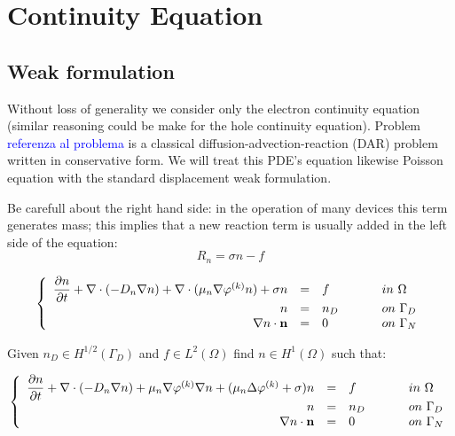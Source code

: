 \section{Continuity Equation}


\subsection{Weak formulation}
Without loss of generality we consider only the electron continuity equation (similar reasoning could be make for the hole continuity equation). Problem \textcolor{blue}{referenza al problema} is a classical diffusion-advection-reaction (DAR) problem written in conservative form. We will treat this PDE's equation likewise Poisson equation with the standard displacement weak formulation.

Be carefull about the right hand side: in the operation of many devices this term generates mass; this implies that a new reaction term is usually added in the left side of the equation:
\begin{equation}
R_n = \sigma n - f
\end{equation}

\begin{equation}
\left\{
\begin{array}{rcll}
\dfrac{\partial n}{\partial t} + \nabla \cdot ( - D_n \nabla n ) + \nabla \cdot ( \mu_n \nabla \varphi^{(k)} n )  + \sigma n & = & f  & \psp{15} in \psp{2} \Omega \\
n & = &  n_D & \psp{15} on \psp{2} \Gamma_D \\
\nabla n \cdot \vect{n} & = & 0 & \psp{15} on \psp{2} \Gamma_N
\end{array}
\right.
\end{equation}

Given $n_D \in H^{1/2}(\Gamma_D)$ and $f \in L^2(\Omega)$ find $n \in H^1(\Omega)$ such that:

\begin{equation}
\left\{
\begin{array}{rcll}
\dfrac{\partial n}{\partial t} + \nabla \cdot ( - D_n \nabla n ) + \mu_n \nabla \varphi^{(k)} \nabla n  + (\mu_n \Delta \varphi^{(k)} + \sigma) n & = & f  & \psp{15} in \psp{2} \Omega \\
n & = &  n_D & \psp{15} on \psp{2} \Gamma_D \\
\nabla n \cdot \vect{n} & = & 0 & \psp{15} on \psp{2} \Gamma_N
\end{array}
\right.
\end{equation}

